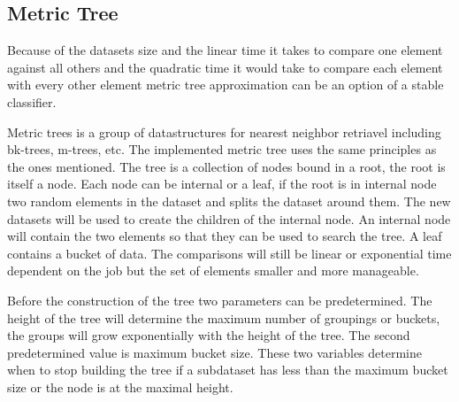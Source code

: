 \subsection{Metric Tree}
Because of the datasets size and the linear time it takes to compare one element against all others and the quadratic time it would take to compare each element with every other element metric tree approximation can be an option of a stable classifier.

Metric trees is a group of datastructures for nearest neighbor retriavel including bk-trees, m-trees, etc. The implemented metric tree uses the same principles as the ones mentioned. The tree is a collection of nodes bound in a root, the root is itself a node. Each node can be internal or a leaf, if the root is in internal node two random elements in the dataset and splits the dataset around them. The new datasets will be used to create the children of the internal node. An internal node will contain the two elements so that they can be used to search the tree. A leaf contains a bucket of data. The comparisons will still be linear or exponential time dependent on the job but the set of elements smaller and more manageable.

Before the construction of the tree two parameters can be predetermined. The height of the tree will determine the maximum number of groupings or buckets, the groups will grow exponentially with the height of the tree. The second predetermined value is maximum bucket size. These two variables determine when to stop building the tree if a subdataset has less than the maximum bucket size or the node is at the maximal height.
